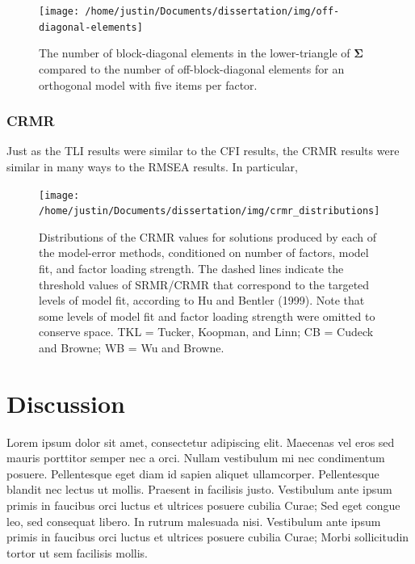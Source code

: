 \documentclass[11pt]{umnthesis}
\begin{document}
\begin{figure}

{\centering \texttt{[image: /home/justin/Documents/dissertation/img/off-diagonal-elements]} 

}

\caption[The number of block-diagonal elements in the lower-triangle of $\bm{\Sigma}$ compared to the number of off-block-diagonal elements for an orthogonal model with five items per factor]{The number of block-diagonal elements in the lower-triangle of $\bm{\Sigma}$ compared to the number of off-block-diagonal elements for an orthogonal model with five items per factor.}\label{fig:off-diag-elements}
\end{figure}

\hypertarget{crmr}{%
\subsection{CRMR}\label{crmr}}

Just as the TLI results were similar to the CFI results, the CRMR results were similar in many ways to the RMSEA results. In particular,

\begin{figure}

{\centering \texttt{[image: /home/justin/Documents/dissertation/img/crmr\_distributions]} 

}

\caption[Distributions of the CRMR values for solutions produced by each of the model-error methods, conditioned on number of factors, model fit, and factor loading strength]{Distributions of the CRMR values for solutions produced by each of the model-error methods, conditioned on number of factors, model fit, and factor loading strength. The dashed lines indicate the threshold values of SRMR/CRMR that correspond to the targeted levels of model fit, according to Hu and Bentler (1999). Note that some levels of model fit and factor loading strength were omitted to conserve space. TKL = Tucker, Koopman, and Linn; CB = Cudeck and Browne; WB = Wu and Browne.}\label{fig:crmr-distributions}
\end{figure}

\hypertarget{discussion}{%
\chapter{Discussion}\label{discussion}}

Lorem ipsum dolor sit amet, consectetur adipiscing elit. Maecenas vel eros sed mauris porttitor semper nec a orci. Nullam vestibulum mi nec condimentum posuere. Pellentesque eget diam id sapien aliquet ullamcorper. Pellentesque blandit nec lectus ut mollis. Praesent in facilisis justo. Vestibulum ante ipsum primis in faucibus orci luctus et ultrices posuere cubilia Curae; Sed eget congue leo, sed consequat libero. In rutrum malesuada nisi. Vestibulum ante ipsum primis in faucibus orci luctus et ultrices posuere cubilia Curae; Morbi sollicitudin tortor ut sem facilisis mollis.
\end{document}
